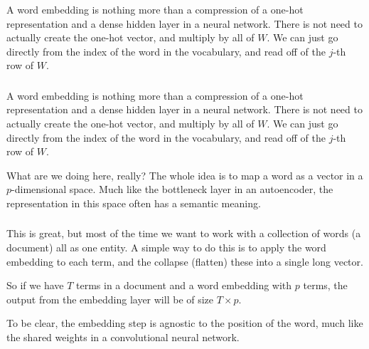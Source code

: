 \documentclass[xetex,mathserif,serif,aspectratio=169]{beamer}
\begin{document}
\begin{frame}[fragile] \frametitle{} \oldB \small


A word embedding is nothing more than a compression of a one-hot
representation and a dense hidden layer in a neural network. There
is not need to actually create the one-hot vector, and multiply by
all of $W$. We can just go directly from the index of the word in
the vocabulary, and read off of the $j$-th row of $W$.

\end{frame}

\begin{frame}[fragile] \frametitle{} \oldB \small


A word embedding is nothing more than a compression of a one-hot
representation and a dense hidden layer in a neural network. There
is not need to actually create the one-hot vector, and multiply by
all of $W$. We can just go directly from the index of the word in
the vocabulary, and read off of the $j$-th row of $W$.

What are we doing here, really? The whole idea is to map a word as
a vector in a $p$-dimensional space. Much like the bottleneck layer
in an autoencoder, the representation in this space often has a
semantic meaning.

\end{frame}

\begin{frame}[fragile] \frametitle{} \oldB \small


This is great, but most of the time we want to work with
a collection of words (a document) all as one entity. A
simple way to do this is to apply the word embedding to
each term, and the collapse (flatten) these into a single
long vector.

So if we have $T$ terms in a document and a word embedding
with $p$ terms, the output from the embedding layer will be
of size $T \times p$.

To be clear, the embedding step is agnostic to the position
of the word, much like the shared weights in a convolutional
neural network.

\end{frame}
\end{document}
